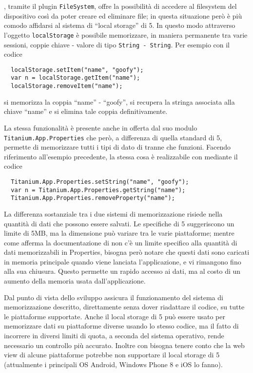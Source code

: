             \pg{}, tramite il plugin
            \texttt{FileSystem}, offre la possibilità di accedere al filesys\-tem
            del dispositivo così da poter creare ed eliminare file; in questa
            situazione però è più comodo affidarsi al sistema di ``lo\-cal stor\-age''
            di \html{}5. In questo modo attraverso l'oggetto \js{} \texttt{localStorage}
            è possibile memorizzare, in maniera permanente tra varie sessioni, coppie
            chiave - valore di tipo \texttt{String - String}. Per esempio con il
            codice
            \begin{lstlisting}
  localStorage.setItem("name", "goofy");
  var n = localStorage.getItem("name");
  localStorage.removeItem("name");
            \end{lstlisting}
            si memorizza la coppia ``name'' - ``goofy'', si recupera la stringa associata
            alla chiave ``name'' e si elimina tale coppia definitivamente.

            La stessa funzionalità è presente anche in \tisdk{} offerta dal suo
            modulo \texttt{Titanium.App.Properties} che però, a differenza di
            quella standard di \html{}5, permette di memorizzare tutti i tipi di
            dato di \js{} tranne che funzioni. Facendo riferimento all'esempio
            precedente, la stessa cosa è realizzabile con \tisdk{} mediante il
            codice
            \begin{lstlisting}
  Titanium.App.Properties.setString("name", "goofy");
  var n = Titanium.App.Properties.getString("name");
  Titanium.App.Properties.removeProperty("name");
            \end{lstlisting}

            La differenza sostanziale tra i due sistemi di memorizzazione risiede
            nella quantità di dati che possono essere salvati.
            Le specifiche di \html{}5 suggeriscono un limite di 5MB, ma la dimensione
            può variare tra le varie piattaforme; mentre come afferma la documentazione
            di \tisdk{} non c'è un limite specifico alla quantità di dati memorizzabili
            in Properties, bisogna però notare che questi dati sono caricati in
            memoria principale quando
            viene lanciata l'applicazione, e vi rimangono fino alla sua chiusura.
            Questo permette un rapido accesso ai dati, ma al costo di un aumento
            della memoria usata dall'applicazione.

            Dal punto di vista dello sviluppo \crossplat{} \tisdk{} assicura il funzionamento
            del sistema di memorizzazione descritto, direttamente senza dover riadattare il codice,
            su tutte le piattaforme supportate. Anche il local storage
            di \html{}5 può essere usato per memorizzare dati su piattaforme diverse
            usando lo stesso codice, ma il fatto di incorrere in diversi limiti di quota,
            a seconda del sistema operativo, rende necessario un controllo più
            accurato. Inoltre con \pg{} bisogna tenere conto che la web view di
            alcune piattaforme potrebbe non supportare il local storage di \html{}5
            (attualmente i principali OS Android, Windows Phone 8 e iOS lo fanno).

